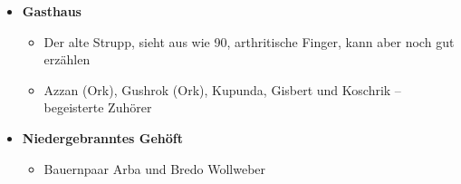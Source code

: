   \begin{itemize}
  	\item \textbf{Gasthaus}
                \begin{itemize}
        	\item  Der alte Strupp, sieht aus wie 90, arthritische Finger, kann aber noch gut erzählen
        \item Azzan (Ork), Gushrok (Ork), Kupunda, Gisbert und Koschrik -- begeisterte Zuhörer
        \end{itemize}
    \item \textbf{Niedergebranntes Gehöft}
                \begin{itemize}
        	\item Bauernpaar Arba und Bredo Wollweber
        	\end{itemize}
\end{itemize}

